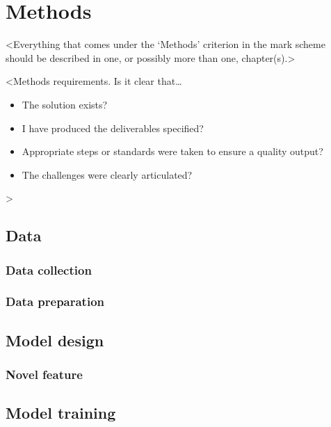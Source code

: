 \chapter{Methods}
\label{chapter2}

<Everything that comes under the `Methods' criterion in the mark scheme should be described in one, or possibly more than one, chapter(s).>

<Methods requirements. Is it clear that\dots
\begin{itemize}
    \item The solution exists?
    \item I have produced the deliverables specified?
    \item Appropriate steps or standards were taken to ensure a quality output?
    \item The challenges were clearly articulated?
\end{itemize}
>

\section{Data}

\subsection{Data collection}
\lipsum[5]

\subsection{Data preparation}
\lipsum[6]

\section{Model design}
\lipsum[7]

\subsection{Novel feature}
\lipsum[8]

\section{Model training}
\lipsum[9]
